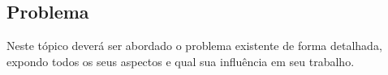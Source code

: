 


\subsection{Problema}
    \label{subsec:problema}
    
    Neste tópico deverá ser abordado o problema existente de forma detalhada, expondo todos os seus aspectos e qual sua influência em seu trabalho.